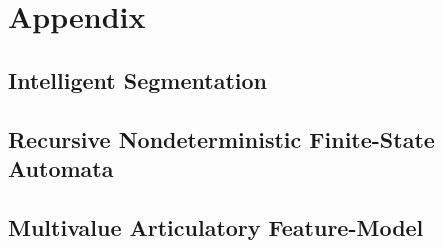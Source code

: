 \documentclass[10pt,letterpaper]{article}
\begin{document}
\section{Appendix}\label{sec:appendix}

\subsection{Intelligent Segmentation}\label{sec:segmentation}

\subsection{Recursive Nondeterministic Finite-State Automata}\label{sec:rndfa}

\subsection{Multivalue Articulatory Feature-Model}\label{sec:mafm}
\end{document}
